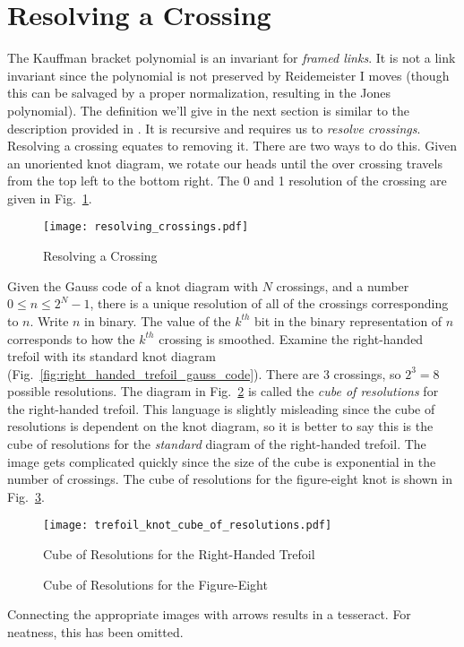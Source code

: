 \documentclass{article}
\theoremstyle{plain}
\begin{document}
    \section{Resolving a Crossing}
        The Kauffman bracket polynomial is an invariant for
        \textit{framed links}. It is not a link invariant since the polynomial
        is not preserved by Reidemeister I moves (though this can be salvaged
        by a proper normalization, resulting in the Jones polynomial). The
        definition we'll give in the next section is similar to the
        description provided in \cite{barnatan2002khovanov}. It is recursive
        and requires us to \textit{resolve crossings}. Resolving a crossing
        equates to removing it. There are two ways to do this.
        Given an unoriented knot diagram, we rotate our heads until
        the over crossing travels from the top left to the bottom right. The
        0 and 1 resolution of the crossing are given in
        Fig.~\ref{fig:resolving_crossing}.
        \begin{figure}
            \centering
            \texttt{[image: resolving\_crossings.pdf]}
            \caption{Resolving a Crossing}
            \label{fig:resolving_crossing}
        \end{figure}
        Given the Gauss code of a knot diagram with $N$ crossings, and a number
        $0\leq{n}\leq{2}^{N}-1$, there is a unique resolution of all of the
        crossings corresponding to $n$. Write $n$ in binary. The value of the
        $k^{th}$ bit in the binary representation of $n$ corresponds to how the
        $k^{th}$ crossing is smoothed. Examine the right-handed trefoil with its
        standard knot diagram (Fig.~\ref{fig:right_handed_trefoil_gauss_code}).
        There are 3 crossings, so $2^{3}=8$ possible resolutions. The diagram
        in Fig.~\ref{fig:trefoil_knot_cube_of_resolutions} is called the
        \textit{cube of resolutions} for the right-handed
        trefoil. This language is slightly misleading since the cube of
        resolutions is dependent on the knot diagram, so it is better to say
        this is the cube of resolutions for the \textit{standard} diagram of
        the right-handed trefoil. The image gets complicated quickly since the
        size of the cube is exponential in the number of crossings. The cube of
        resolutions for the figure-eight knot is shown in
        Fig.~\ref{fig:figure_eight_knot_cube_of_resolutions}.
        \begin{figure}
            \centering
            \texttt{[image: trefoil\_knot\_cube\_of\_resolutions.pdf]}
            \caption{Cube of Resolutions for the Right-Handed Trefoil}
            \label{fig:trefoil_knot_cube_of_resolutions}
        \end{figure}
        \begin{figure}
            \centering
            \caption{Cube of Resolutions for the Figure-Eight}
            \label{fig:figure_eight_knot_cube_of_resolutions}
        \end{figure}
        Connecting the appropriate images with arrows results in a tesseract.
        For neatness, this has been omitted.
\end{document}
